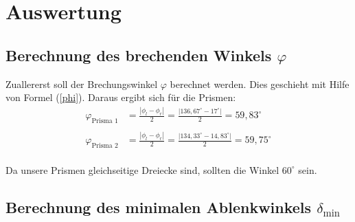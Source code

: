 \documentclass[fontsize=12pt]{scrartcl}
\renewcommand{\l}{\left\vert}
\renewcommand{\r}{\right\vert}
\begin{document}
\section{ Auswertung}

\subsection{Berechnung des brechenden Winkels $\varphi$}

Zuallererst soll der Brechungswinkel $\varphi$ berechnet werden. Dies geschieht mit Hilfe von Formel (\ref{phi}). Daraus ergibt sich für die Prismen:
\begin{align*}
\varphi_{\text{Prisma 1}} &=\frac{\l \phi_l - \phi_r  \r}{2} = \frac{\l 136,67^{\circ} - 17^{\circ}  \r}{2} = 59,83^{\circ} \\
~\\
\varphi_{\text{Prisma 2}} &=\frac{\l \phi_l - \phi_r  \r}{2} = \frac{\l 134,33^{\circ} - 14,83^{\circ}  \r}{2} = 59,75^{\circ}
\end{align*}\\

Da unsere Prismen gleichseitige Dreiecke sind, sollten die Winkel $60^{\circ}$ sein. 

\subsection{Berechnung des minimalen Ablenkwinkels $\delta_{\text{min}}$}
\end{document}
